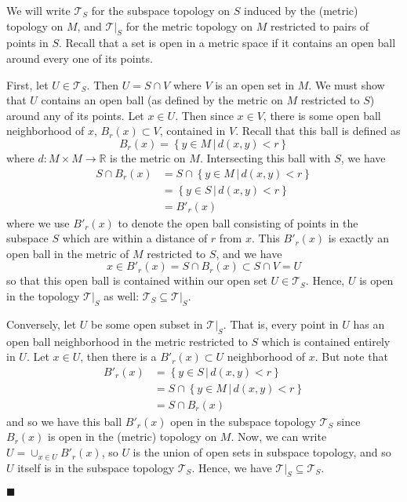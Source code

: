 \documentclass[12pt]{article}
\renewcommand{\qed}{\hfill$\blacksquare$}
\renewenvironment{proof}{\begin{addmargin}[1em]{0em}\begin{newproof}}{\end{newproof}\end{addmargin}\qed}
\begin{document}
\begin{proof}
We will write $\mathcal{T}_S$ for the subspace topology on $S$ induced by the (metric) topology on $M$, and $\mathcal{T}|_S$ for the metric topology on $M$ restricted to pairs of points in $S$. Recall that a set is open in a metric space if it contains an open ball around every one of its points.

First, let $U \in \mathcal{T}_S$. Then $U=S\cap V$ where $V$ is an open set in $M$. We must show that $U$ contains an open ball (as defined by the metric on $M$ restricted to $S$) around any of its points. Let $x \in U$. Then since $x \in V$, there is some open ball neighborhood of $x$, $B_r\left(x\right) \subset V$, contained in $V$. Recall that this ball is defined as $$ B_r\left(x\right) = \left\{ y\in M \, | \, d\left(x,y\right) < r \right\}$$ where $d:M\times M \rightarrow \mathbb{R}$ is the metric on $M$. Intersecting this ball with $S$, we have
\begin{equation*}
\begin{split}
	S\cap B_r\left(x\right) & = S\cap  \left\{ y\in M \, | \, d\left(x,y\right) < r \right\} \\
	& =  \left\{ y\in S \, | \, d\left(x,y\right) < r \right\} \\
	& = B'_r\left(x\right)
\end{split}
\end{equation*}
where we use $B'_r\left(x\right)$ to denote the open ball consisting of points in the subspace $S$ which are within a distance of $r$ from $x$. This $B'_r\left(x\right)$ is exactly an open ball in the metric of $M$ restricted to $S$, and we have $$ x \in B'_r\left(x\right) = S\cap B_r\left(x\right) \subset S\cap V = U$$ so that this open ball is contained within our open set $U\in \mathcal{T}_S$. Hence, $U$ is open in the topology $\mathcal{T}|_S$ as well: $\mathcal{T}_S \subseteq \mathcal{T}|_S$.

Conversely, let $U$ be some open subset in $\mathcal{T}|_S$. That is, every point in $U$ has an open ball neighborhood in the metric restricted to $S$ which is contained entirely in $U$. Let $x \in U$, then there is a $B'_r\left(x\right) \subset U$ neighborhood of $x$. But note that
\begin{equation*}
\begin{split}
B'_r\left(x\right) & = \left\{ y\in S \, | \, d\left(x,y\right)<r\right\} \\
& = S\cap \left\{y\in M \, | \, d\left(x,y\right)<r\right\} \\
& = S\cap B_r\left(x\right)
\end{split}
\end{equation*}
and so we have this ball $B'_r\left(x\right)$ open in the subspace topology $\mathcal{T}_S$ since $B_r\left(x\right)$ is open in the (metric) topology on $M$. Now, we can write $U = \cup_{x\in U} B'_r\left(x\right)$, so $U$ is the union of open sets in subspace topology, and so $U$ itself is in the subspace topology $\mathcal{T}_S$. Hence, we have $\mathcal{T}|_S \subseteq \mathcal{T}_S$.


\end{proof}
\end{document}
